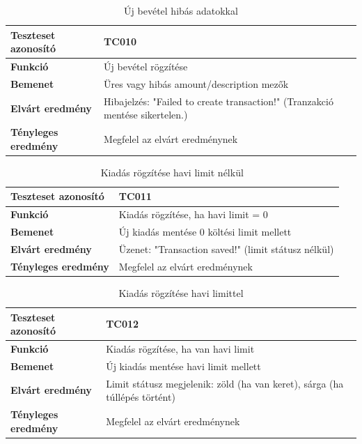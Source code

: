 \begin{table}[h!]
	\centering
	\begin{tabular}{|l|p{10cm}|}
		\hline
		\textbf{Teszteset azonosító} & TC010 \\ \hline
		\textbf{Funkció} & Új bevétel rögzítése \\ \hline
		\textbf{Bemenet} & Üres vagy hibás amount/description mezők \\ \hline
		\textbf{Elvárt eredmény} & Hibajelzés: "Failed to create transaction!" (Tranzakció mentése sikertelen.) \\ \hline
		\textbf{Tényleges eredmény} & Megfelel az elvárt eredménynek \\ \hline
	\end{tabular}
	\caption{Új bevétel hibás adatokkal}
	\label{tab:uj_bevetel_hibas}
\end{table}

\begin{table}[h!]
	\centering
	\begin{tabular}{|l|p{10cm}|}
		\hline
		\textbf{Teszteset azonosító} & TC011 \\ \hline
		\textbf{Funkció} & Kiadás rögzítése, ha havi limit = 0 \\ \hline
		\textbf{Bemenet} & Új kiadás mentése 0 költési limit mellett \\ \hline
		\textbf{Elvárt eredmény} & Üzenet: "Transaction saved!" (limit státusz nélkül) \\ \hline
		\textbf{Tényleges eredmény} & Megfelel az elvárt eredménynek \\ \hline
	\end{tabular}
	\caption{Kiadás rögzítése havi limit nélkül}
	\label{tab:kiadas_limit_nelkul}
\end{table}

\begin{table}[h!]
	\centering
	\begin{tabular}{|l|p{10cm}|}
		\hline
		\textbf{Teszteset azonosító} & TC012 \\ \hline
		\textbf{Funkció} & Kiadás rögzítése, ha van havi limit \\ \hline
		\textbf{Bemenet} & Új kiadás mentése havi limit mellett \\ \hline
		\textbf{Elvárt eredmény} & Limit státusz megjelenik: zöld (ha van keret), sárga (ha túllépés történt) \\ \hline
		\textbf{Tényleges eredmény} & Megfelel az elvárt eredménynek \\ \hline
	\end{tabular}
	\caption{Kiadás rögzítése havi limittel}
	\label{tab:kiadas_limit_ellenorzes}
\end{table}

